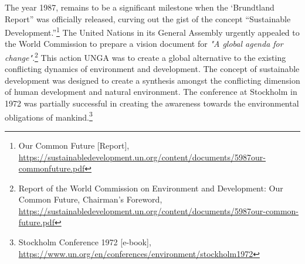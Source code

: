 \setcounter{figure}{0}
\setcounter{table}{0}
\setcounter{footnote}{0}

\label{2021-art5}

\vspace{-.3cm}




\begin{multicols}{2}


\vspace{-.15cm}

\noi
The year 1987, remains to be a significant milestone when the ‘Brundtland Report” was
officially released, curving out the gist of the concept “Sustainable Development.”\footnote{Our Common Future [Report], \url{https://sustainabledevelopment.un.org/content/documents/5987our-commonfuture.pdf}}
 The
United Nations in its General Assembly urgently appealed to the World Commission to
prepare a vision document for \textit{"A global agenda for change"}.\footnote{Report of the World Commission on Environment and Development: Our Common Future, Chairman’s Foreword, \url{https://sustainabledevelopment.un.org/content/documents/5987our-common-future.pdf}}
 This action UNGA was to
create a global alternative to the existing conflicting dynamics of environment and
development. The concept of sustainable development was designed to create a synthesis
amongst the conflicting dimension of human development and natural environment. The
conference at Stockholm in 1972 was partially successful in creating the awareness towards
the environmental obligations of mankind.\footnote{Stockholm Conference 1972 [e-book], \url{https://www.un.org/en/conferences/environment/stockholm1972}}

\vspace{-.15cm}


\end{multicols}
